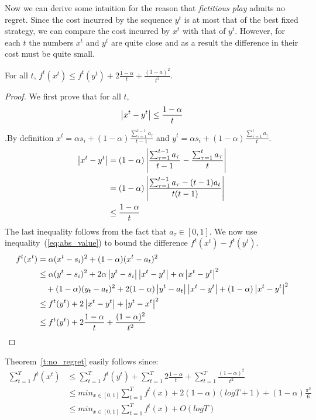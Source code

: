 Now we can derive some intuition for the reason that \emph{fictitious play} admits
no regret. Since the cost incurred by the sequence $y^t$ is at most that of the best
fixed strategy, we can compare the cost incurred by $x^t$ with that of $y^t$.
However, for each $t$ the numbers $x^t$ and $y^t$ are quite close and as a result
the difference in their cost must be quite small. 

\begin{lemma}
  For all $t$, $f^t(x^t) \leq f^t(y^t) + 2\frac{1-\alpha}{t} + \frac{(1-a)^2}{t^2}$.
\end{lemma}
\begin{proof}
  We first prove that for all $t$, 
  \begin{equation}\label{eq:abs_value}
  	\left|x^t - y^t \right| \leq \frac{1-\alpha}{t}
  \end{equation}
  .By definition $x^t = \alpha s_i + (1-\alpha)\frac{\sum_{\tau = 1}^{t-1} a_\tau}{t-1}$
  and $ y^t = \alpha s_i + (1-\alpha)\frac{\sum_{\tau = 1}^t a_\tau}{t}$.
  \begin{align*}
    \left|x^t - y^t\right|
    &=
    (1-\alpha)\left|\frac{\sum_{\tau = 1}^{t-1}a_\tau}{t-1}
    - \frac{\sum_{\tau = 1}^t a_\tau}{t}\right|\\
    &=
    (1-\alpha)\left|\frac{\sum_{\tau = 1}^{t-1}a_\tau -(t-1)a_t}{t(t-1)}\right|\\
    &\leq
    \frac{1-\alpha}{t}
  \end{align*}
  The last inequality follows from the fact that $a_\tau \in [0,1]$.
  We now use inequality~(\ref{eq:abs_value}) to bound the difference $f^t(x^t) - f^t(y^t)$.
  \begin{align*}
    f^t(x^t)
    &=
    \alpha(x^t - s_i)^2 + (1 - \alpha)(x^t - a_t)^2 \\
    &\leq
    \alpha(y^t - s_i)^2 + 2\alpha\left|y^t -
    s_i\right|\left|x^t - y^t\right| + \alpha \left|x^t - y^t\right|^2 \\
    &\quad + (1-\alpha)(y_t - a_t)^2 +
    2(1-\alpha)\left|y^t - a_t\right|\left|x^t-y^t\right| + (1 - \alpha)\left|x^t - y^t\right|^2\\
    &\leq
    f^t(y^t) + 2\left|x^t - y^t\right| + \left|y^t - x^t\right|^2\\
    &\leq
    f^t(y^t) + 2\frac{1-\alpha}{t} + \frac{(1-\alpha)^2}{t^2}
  \end{align*}
\end{proof}





Theorem~\ref{t:no_regret} easily follows since:
\begin{align*}
  \sum_{t=1}^T f^t(x^t)
  &\leq
  \sum_{t=1}^T f^t(y^t) + \sum_{t=1}^T 2\frac{1-\alpha}{t} +
  \sum_{t=1}^T \frac{(1-\alpha)^2}{t^2}\\
  &\leq
  min_{x \in [0,1]} \sum_{t=1}^T f^t(x) +
  2(1-\alpha)(logT + 1) + (1-\alpha)\frac{\pi^2}{6}\\
  &\leq
  min_{x \in [0,1]} \sum_{t=1}^T f^t(x) + O(logT)
\end{align*}